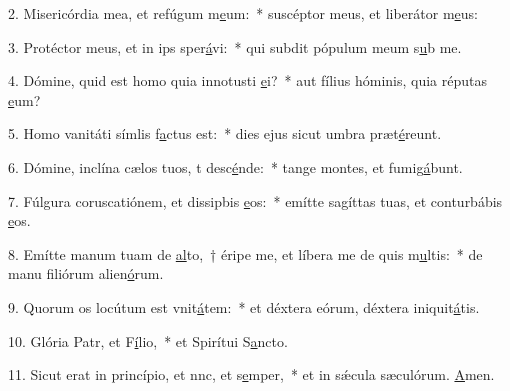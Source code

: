 2. Misericórdia mea, et refúgum m\uline{e}um:~* suscéptor meus, et liberátor m\uline{e}us:\par 
3. Protéctor meus, et in ips sper\uline{á}vi:~* qui subdit pópulum meum s\uline{u}b me.\par 
4. Dómine, quid est homo quia innotusti \uline{e}i?~* aut fílius hóminis, quia réputas \uline{e}um?\par 
5. Homo vanitáti símlis f\uline{a}ctus est:~* dies ejus sicut umbra præt\uline{é}reunt.\par 
6. Dómine, inclína cælos tuos, t desc\uline{é}nde:~* tange montes, et fumig\uline{á}bunt.\par 
7. Fúlgura coruscatiónem, et dissipbis \uline{e}os:~* emítte sagíttas tuas, et conturbábis \uline{e}os.\par 
8. Emítte manum tuam de \uline{al}to,~† éripe me, et líbera me de quis m\uline{u}ltis:~* de manu filiórum alien\uline{ó}rum.\par 
9. Quorum os locútum est vnit\uline{á}tem:~* et déxtera eórum, déxtera iniquit\uline{á}tis.\par 
10. Glória Patr, et F\uline{í}lio,~* et Spirítui S\uline{a}ncto.\par 
11. Sicut erat in princípio, et nnc, et s\uline{e}mper,~* et in sǽcula sæculórum. \uline{A}men.\par 
